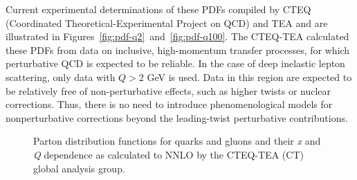 Current experimental determinations of these PDFs compiled by CTEQ (Coordinated Theoretical-Experimental Project on QCD) and TEA and are illustrated in Figures~\ref{fig:pdf-q2}~and~\ref{fig:pdf-q100}. The CTEQ-TEA calculated these PDFs from data on inclusive, high-momentum transfer processes, for which perturbative QCD is expected to be reliable. In the case of deep inelastic lepton scattering, only data with $Q > 2$ GeV is used. Data in this region are expected to be relatively free of non-perturbative effects, such as higher twists or nuclear corrections. Thus, there is no need to introduce phenomenological models for nonperturbative corrections beyond the leading-twist perturbative contributions\cite{Dulat:2015mca}.

\begin{figure}
	\centering
	\hspace{8pt}%
	\caption{Parton distribution functions for quarks and gluons and their \emph{x} and \emph{Q} dependence as calculated to NNLO by the CTEQ-TEA (CT) global analysis group\cite{Dulat:2015mca}.}
	\label{fig:pdf-q2-q100}
\end{figure}


